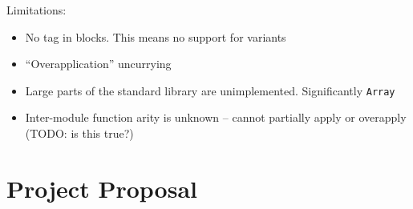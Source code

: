\documentclass[12pt,a4paper,twoside,openright]{report}
\begin{document}
Limitations:

\begin{itemize}
  \item No tag in blocks. This means no support for variants
  \item ``Overapplication'' uncurrying
  \item Large parts of the standard library are unimplemented. Significantly \lstinline!Array!
  \item Inter-module function arity is unknown -- cannot partially apply or overapply (TODO: is this true?)
\end{itemize}




\appendix

%
%
%
%
%
%
%
\chapter{Project Proposal}

%
\end{document}
